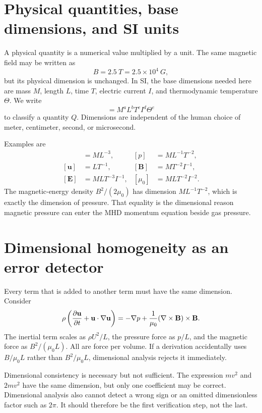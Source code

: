 \documentclass[11pt]{article}
\begin{document}
\section{Physical quantities, base dimensions, and SI units}

A physical quantity is a numerical value multiplied by a unit. The same magnetic field may be written as
\begin{equation}
B=2.5\ \si{T}=2.5\times10^{4}\ \si{G},
\end{equation}
but its physical dimension is unchanged. In SI, the base dimensions needed here are mass $M$, length $L$, time $T$, electric current $I$, and thermodynamic temperature $\Theta$. We write
\begin{equation}
[Q]=M^aL^bT^cI^d\Theta^e
\end{equation}
to classify a quantity $Q$. Dimensions are independent of the human choice of meter, centimeter, second, or microsecond.

Examples are
\begin{align}
[\rho]&=ML^{-3},&
[p]&=ML^{-1}T^{-2},\\
[\mathbf u]&=LT^{-1},&
[\mathbf B]&=MT^{-2}I^{-1},\\
[\mathbf E]&=MLT^{-3}I^{-1},&
[\mu_0]&=MLT^{-2}I^{-2}.
\end{align}
The magnetic-energy density $B^2/(2\mu_0)$ has dimension $ML^{-1}T^{-2}$, which is exactly the dimension of pressure. That equality is the dimensional reason magnetic pressure can enter the MHD momentum equation beside gas pressure.


\section{Dimensional homogeneity as an error detector}

Every term that is added to another term must have the same dimension. Consider
\begin{equation}
\rho\left(\pdv{\mathbf u}{t}+\mathbf u\cdot\nabla\mathbf u\right)
=-\nabla p+\frac{1}{\mu_0}(\nabla\times\mathbf B)\times\mathbf B.
\end{equation}
The inertial term scales as $\rho U^2/L$, the pressure force as $p/L$, and the magnetic force as $B^2/(\mu_0L)$. All are force per volume. If a derivation accidentally uses $B/\mu_0L$ rather than $B^2/\mu_0L$, dimensional analysis rejects it immediately.

Dimensional consistency is necessary but not sufficient. The expression $mv^2$ and $2mv^2$ have the same dimension, but only one coefficient may be correct. Dimensional analysis also cannot detect a wrong sign or an omitted dimensionless factor such as $2\pi$. It should therefore be the first verification step, not the last.
\end{document}
